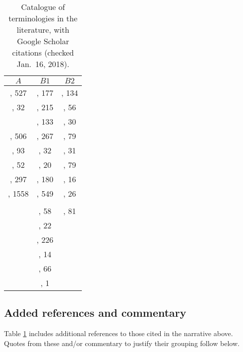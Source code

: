 \documentclass{statement}
\newlength{\up}
\begin{document}
\begin{table}[h]
\caption{Catalogue of terminologies in the literature, with Google Scholar citations (checked Jan.\ 16, 2018).}
\begin{footnotesize}
\begin{tabular}{c c c}
$A$				&	$B1$				&	$B2$ \\ \hline
\cite{king1995}, 527	& \cite{pengETal2006}, 177	& \cite{drummond2009}, 134 \\
\cite{jcgm2008}, 32		& \cite{gentlemanETal2007}, 215& \cite{casadevall_fang2010}, 56\\
				& \cite{laineETal2007}, 133	& \cite{stodden2011}, 30\\
\cite{dewaldETal1986}, 506 & \cite{vandewalleETal2009}, 267& \cite{davison2012}, 79 \\
\cite{mccullough2008}, 93 & \cite{leveque2009}, 32	& \cite{loscalzo2012}, 31\\
\cite{garijoETal2013}, 52 & \cite{hyndman2010}, 20	& \cite{levequeETal2012}, 79\\
\cite{openscience2012}, 297	& \cite{jasnyETal2011}, 180& \cite{crook2013}, 16\\
\cite{openscience2015}, 1558	& \cite{peng2011}, 549 	& \cite{cooper2015}, 26\\
				& 					& \\
				& \cite{koenkerETal2009}, 58	& \cite{cartwright1991}, 81\\
				&\cite{delescluseETal2012}, 22	&\\
				&  \cite{sandveETal2013}, 226	& \\
				& \cite{topalidou2015}, 14	& \\
				&\cite{iqbalETal2016}, 66	& \\
				&\cite{stevens2017}, 1	& \\
\end{tabular}
\end{footnotesize}
\label{repro-table}
\end{table}%

\subsection*{Added references and commentary}
\vspace{\up}

Table \ref{repro-table} includes additional references to those cited in the narrative above.  Quotes from these and/or commentary to justify their grouping follow below.
\end{document}
